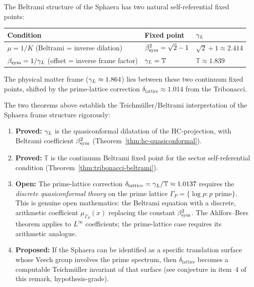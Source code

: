 \begin{remark}
\label{rem:two-fixed-points}
The Beltrami structure of the Sphaera has two natural self-referential
fixed points:
\begin{center}
\renewcommand{\arraystretch}{1.3}
\begin{tabular}{lll}
\toprule
Condition & Fixed point & $\gamma_L$ \\
\midrule
$\mu = 1/K$ (Beltrami = inverse dilation) & $\beta_{\mathrm{sym}}^2 = \sqrt{2}-1$ & $\sqrt{2}+1 \approx 2.414$ \\
$\beta_{\mathrm{sym}} = 1/\gamma_L$ (offset = inverse frame factor) & $\gamma_L = \mathbb{T}$ & $\mathbb{T} \approx 1.839$ \\
\bottomrule
\end{tabular}
\end{center}
The physical matter frame ($\gamma_L \approx 1.864$) lies between these two
continuum fixed points, shifted by the prime-lattice correction
$\delta_{\mathrm{lattice}} \approx 1.014$ from the Tribonacci.
\end{remark}

\begin{remark}
\label{rem:teichmuller-status}
The two theorems above establish the Teichmüller/Beltrami interpretation
of the Sphaera frame structure rigorously:
\begin{enumerate}[label=(\arabic*)]
  \item \textbf{Proved:} $\gamma_L$ is the quasiconformal dilatation of the
    HC-projection, with Beltrami coefficient $\beta_{\mathrm{sym}}^2$
    (Theorem~\ref{thm:hc-quasiconformal}).
  \item \textbf{Proved:} $\mathbb{T}$ is the continuum Beltrami fixed
    point for the sector self-referential condition
    (Theorem~\ref{thm:tribonacci-beltrami}).
  \item \textbf{Open:} The prime-lattice correction
    $\delta_{\mathrm{lattice}} = \gamma_L/\mathbb{T} \approx 1.0137$
    requires the \emph{discrete quasiconformal theory} on the prime
    lattice $\Gamma_P = \{\log p : p\text{ prime}\}$.
    This is genuine open mathematics: the Beltrami equation with
    a discrete, arithmetic coefficient $\mu_{\Gamma_P}(x)$ replacing
    the constant $\beta_{\mathrm{sym}}^2$.
    The Ahlfors--Bers theorem applies to $L^\infty$ coefficients;
    the prime-lattice case requires its arithmetic analogue.
  \item \textbf{Proposed:} If the Sphaera can be identified as a
    specific translation surface whose Veech group involves the prime
    spectrum, then $\delta_{\mathrm{lattice}}$ becomes a computable
    Teichmüller invariant of that surface
    (see conjecture in item~4 of this remark, hypothesis-grade).
\end{enumerate}
\end{remark}

